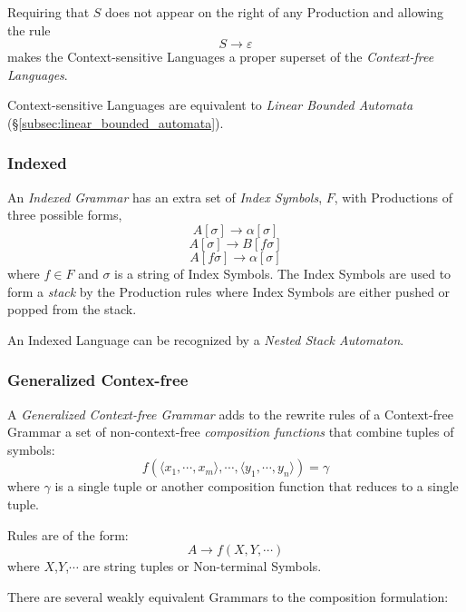 \documentclass{article}
\begin{document}
Requiring that $S$ does not appear on the right of any Production
and allowing the rule
\[
    S \rightarrow \varepsilon
\]
makes the Context-sensitive Languages a proper superset of the
\emph{Context-free Languages}.

Context-sensitive Languages are equivalent to \emph{Linear
Bounded Automata} (\S\ref{subsec:linear_bounded_automata}).

\subsubsection{Indexed}
An \emph{Indexed Grammar} has an extra set of \emph{Index Symbols},
$F$, with Productions of three possible forms,
\[
    A[\sigma] \rightarrow \alpha[\sigma]
\]\[
    A[\sigma] \rightarrow B[f\sigma]
\]\[
    A[f\sigma] \rightarrow \alpha[\sigma]
\]
where $f \in F$ and $\sigma$ is a string of Index Symbols. The Index
Symbols are used to form a \emph{stack} by the Production rules where
Index Symbols are either pushed or popped from the stack.

An Indexed Language can be recognized by a \emph{Nested Stack
  Automaton}\cite{aho69}.

\subsubsection{Generalized Contex-free}
A \emph{Generalized Context-free Grammar} adds to the rewrite rules of
a Context-free Grammar a set of non-context-free \emph{composition
  functions} that combine tuples of symbols:
\[
    f(\langle x_1,\cdots,x_m\rangle,\cdots,\langle
    y_1,\cdots,y_n\rangle)=\gamma
\]
where $\gamma$ is a single tuple or another composition function that
reduces to a single tuple.

Rules are of the form:
\[
    A \rightarrow f(X,Y,\cdots)
\]
where $X$,$Y$,$\cdots$ are string tuples or Non-terminal Symbols.

There are several weakly equivalent Grammars to the composition
formulation:
\end{document}
